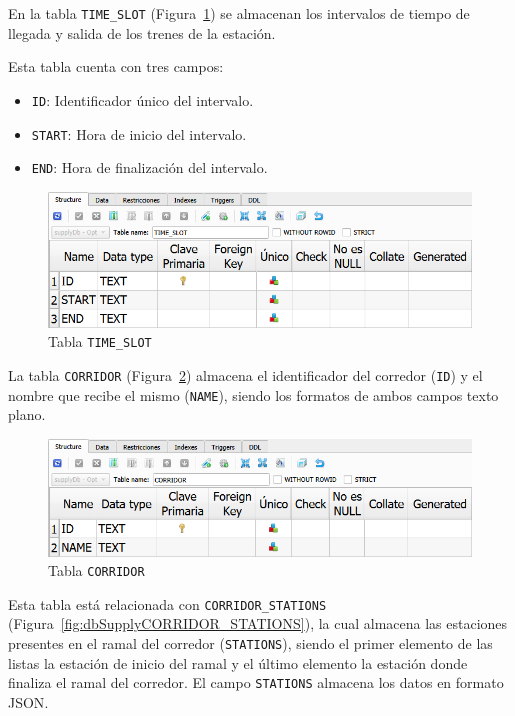 En la tabla \texttt{TIME\_SLOT} (Figura~\ref{fig:dbSupplyTIME_SLOT}) se almacenan los intervalos de tiempo de llegada y salida de los trenes de la estación. 

Esta tabla cuenta con tres campos: 
\begin{itemize}
    \item \texttt{ID}: Identificador único del intervalo.
    \item \texttt{START}: Hora de inicio del intervalo.
    \item \texttt{END}: Hora de finalización del intervalo.
\end{itemize}

\begin{figure}[H]
\centering
\includegraphics[width=.9\textwidth]{fig/Tablas base de datos/Oferta/TIME_SLOT.png}
\caption{Tabla \texttt{TIME\_SLOT}}
\label{fig:dbSupplyTIME_SLOT}
\end{figure}

La tabla \texttt{CORRIDOR} (Figura~\ref{fig:dbSupplyCORRIDOR}) almacena el identificador del corredor (\texttt{ID}) y el nombre que recibe el mismo (\texttt{NAME}), siendo los formatos de ambos campos texto plano.

\begin{figure}[H]
\centering
\includegraphics[width=.9\textwidth]{fig/Tablas base de datos/Oferta/CORRIDOR.png}
\caption{Tabla \texttt{CORRIDOR}}
\label{fig:dbSupplyCORRIDOR}
\end{figure}

Esta tabla está relacionada con \texttt{CORRIDOR\_STATIONS} (Figura~\ref{fig:dbSupplyCORRIDOR_STATIONS}), la cual almacena las estaciones presentes en el ramal del corredor (\texttt{STATIONS}), siendo el primer elemento de las listas la estación de inicio del ramal y el último elemento la estación donde finaliza el ramal del corredor. El campo \texttt{STATIONS} almacena los datos en formato \acrshort{JSON}.

